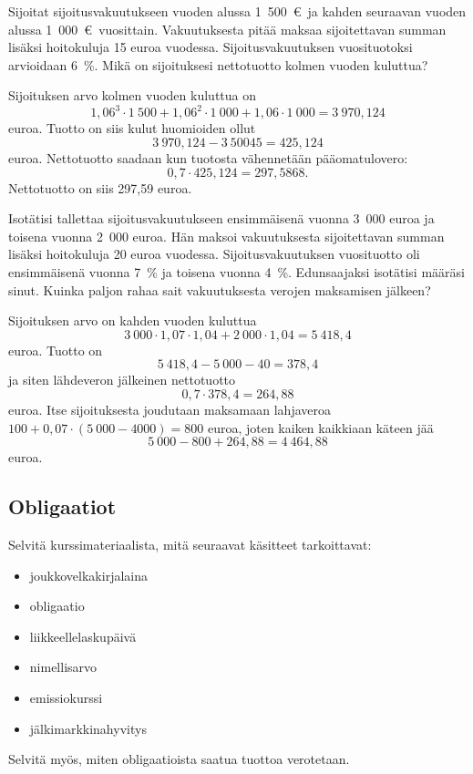 \documentclass{article}\usepackage[]{graphicx}\usepackage[]{color}
\begin{document}
\begin{question} Sijoitat sijoitusvakuutukseen vuoden alussa 1~500~\euro\ ja kahden seuraavan vuoden alussa 1~000~\euro\ vuosittain. Vakuutuksesta pitää maksaa sijoitettavan summan lisäksi hoitokuluja 15 euroa vuodessa. Sijoitusvakuutuksen vuosituotoksi arvioidaan 6~\%. Mikä on sijoituksesi nettotuotto kolmen vuoden kuluttua? 
\end{question}
\begin{solution}


Sijoituksen arvo kolmen vuoden kuluttua on 
\[
  1{,}06^3\cdot1~500 + 1{,}06^2\cdot1~000 + 1{,}06\cdot1~000 = 3~970{,}124
\]
euroa.
Tuotto on siis kulut huomioiden ollut 
\[
  3~970{,}124 - 3~500 45 = 425{,}124
  \]
  euroa. Nettotuotto saadaan kun tuotosta vähennetään pääomatulovero:
\[
  0,7\cdot425{,}124 = 297{,}5868.
\]
Nettotuotto on siis 297{,}59 euroa.
\end{solution}

\begin{question} Isotätisi tallettaa sijoitusvakuutukseen ensimmäisenä vuonna 3~000 euroa ja toisena vuonna 2~000 euroa. Hän maksoi vakuutuksesta sijoitettavan summan lisäksi hoitokuluja 20 euroa vuodessa. Sijoitusvakuutuksen vuosituotto oli ensimmäisenä vuonna 7~\% ja toisena vuonna 4~\%. Edunsaajaksi isotätisi määräsi sinut. Kuinka paljon rahaa sait vakuutuksesta verojen maksamisen jälkeen?
\end{question}
\begin{solution}

Sijoituksen arvo on kahden vuoden kuluttua
\[
  3~000\cdot1{,}07\cdot1{,}04 + 2~000\cdot1{,}04 = 5~418{,}4
\]
euroa. Tuotto on 
\[
  5~418{,}4 - 5~000 - 40 = 378{,}4
\]
ja siten lähdeveron jälkeinen nettotuotto
\[
  0,7\cdot 378{,}4 = 264{,}88
\]
euroa. Itse sijoituksesta joudutaan maksamaan lahjaveroa \(100 + 0,07\cdot(5~000 - 4000) = 800\) euroa, joten kaiken kaikkiaan käteen jää
\[
5~000 - 800 + 264{,}88 = 4~464{,}88
\]
euroa. 
\end{solution}

\subsection*{Obligaatiot}

\begin{question}
  Selvitä kurssimateriaalista, mitä seuraavat käsitteet tarkoittavat:
  \begin{itemize}
    \item joukkovelkakirjalaina
    \item obligaatio
    \item liikkeellelaskupäivä
    \item nimellisarvo
    \item emissiokurssi
    \item jälkimarkkinahyvitys
  \end{itemize}
  Selvitä myös, miten obligaatioista saatua tuottoa verotetaan.
\end{question}
\end{document}
